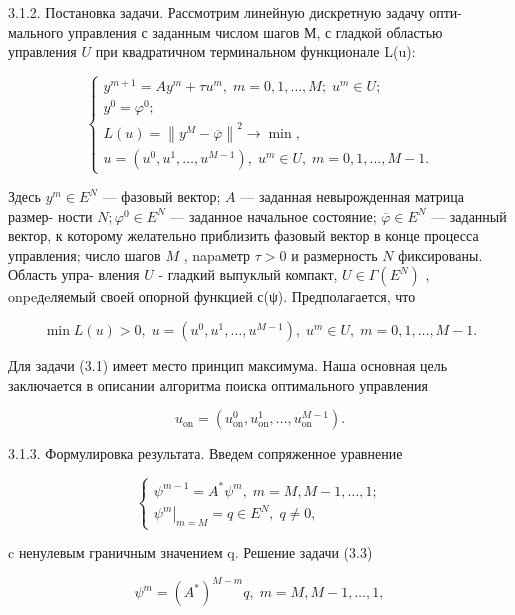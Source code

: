 \documentclass[10pt]{article}
\begin{document}
3.1.2. Постановка задачи. Рассмотрим линейную дискретную задачу опти- мального управления с заданным числом шагов М, с гладкой областью управления \(U\) при квадратичном терминальном функционале L(u):

\[
\left\{  \begin{array}{l} {y}^{m + 1} = A{y}^{m} + \tau {u}^{m},\;m = 0,1,\ldots ,M;\;{u}^{m} \in  U; \\  {y}^{0} = {\varphi }^{0}; \\  L\left( u\right)  = {\left\lVert {y}^{M} - \overline{\varphi } \right\rVert}^{2} \rightarrow  \min , \\  u = \left( {{u}^{0},{u}^{1},\ldots ,{u}^{M - 1}}\right) ,\;{u}^{m} \in  U,\;m = 0,1,\ldots ,M - 1. \end{array}\right. \tag{3.1}
\]

Здесь \({y}^{m} \in  {E}^{N}\) — фазовый вектор; \(A\) — заданная невырожденная матрица размер- ности \(N;{\varphi }^{0} \in  {E}^{N}\) — заданное начальное состояние; \(\overline{\varphi } \in  {E}^{N}\) — заданный вектор, к которому желательно приблизить фазовый вектор в конце процесса управления; число шагов \(M\) , napaметр \(\tau  > 0\) и размерность \(N\) фиксированы. Область упра- вления \(U\) - гладкий выпуклый компакт, \(U \in  \Gamma \left( {E}^{N}\right)\) , onpeдeляемый своей опорной функцией с(ψ). Предполагается, что

\[
\min L\left( u\right)  > 0,\;u = \left( {{u}^{0},{u}^{1},\ldots ,{u}^{M - 1}}\right) ,\;{u}^{m} \in  U,\;m = 0,1,\ldots ,M - 1. \tag{3.2}
\]

Для задачи (3.1) имеет место принцип максимума. Наша основная цель заключается в описании алгоритма поиска оптимального управления

\[
{u}_{\mathrm{{on}}} = \left( {{u}_{\mathrm{{on}}}^{0},{u}_{\mathrm{{on}}}^{1},\ldots ,{u}_{\mathrm{{on}}}^{M - 1}}\right) .
\]

3.1.3. Формулировка результата. Введем сопряженное уравнение

\[
\left\{  \begin{array}{l} {\psi }^{m - 1} = {A}^{ * }{\psi }^{m},\;m = M,M - 1,\ldots ,1; \\  {\left. {\psi }^{m}\right| }_{m = M} = q \in  {E}^{N},\;q \neq  0, \end{array}\right. \tag{3.3}
\]

c ненулевым граничным значением q. Решение задачи (3.3)

\[
{\psi }^{m} = {\left( {A}^{ * }\right) }^{M - m}q,\;m = M,M - 1,\ldots ,1, \tag{3.4}
\]
\end{document}
